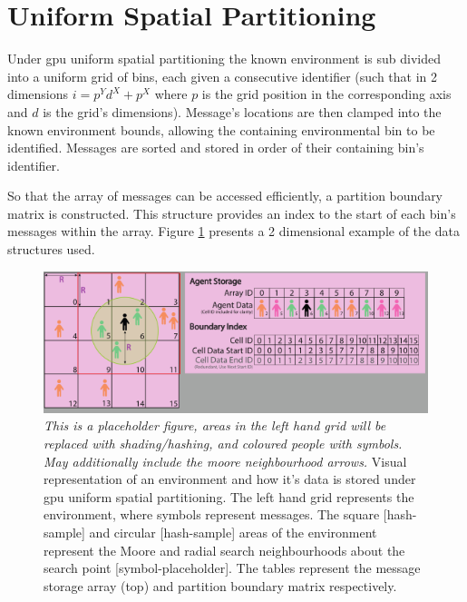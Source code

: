 \section{Uniform Spatial Partitioning\label{sec:spatial-partitioning}}

Under \gls{gpu} uniform spatial partitioning the known environment is sub divided into a uniform grid of bins, each given a consecutive identifier (such that in 2 dimensions $i = p^{Y}d^{X}+p^{X}$ where $p$ is the grid position in the corresponding axis and $d$ is the grid's dimensions). Message's locations are then clamped into the known environment bounds, allowing the containing environmental bin to be identified. Messages are sorted and stored in order of their containing bin's identifier.

So that the array of messages can be accessed efficiently, a partition boundary matrix is constructed. This structure provides an index to the start of each bin's messages within the array. Figure \ref{fig:uniform-spatial-partitioning} presents a 2 dimensional example of the data structures used.

\begin{figure}[!t]
\centering
\includegraphics[width=\textwidth]{../resources/usp/placeholder.png}
\caption{\label{fig:uniform-spatial-partitioning}%
\textit{This is a placeholder figure, areas in the left hand grid will be replaced with shading/hashing, and coloured people with symbols. May additionally include the moore neighbourhood arrows.}\newline
Visual representation of an environment and how it's data is stored under \gls{gpu} uniform spatial partitioning.%
The left hand grid represents the environment, where symbols represent messages. The square [hash-sample] and  circular [hash-sample] areas of the environment represent the Moore and radial search neighbourhoods about the search point [symbol-placeholder].%
The tables represent the message storage array (top) and partition boundary matrix respectively.
}
\end{figure}

